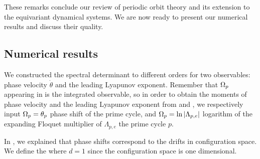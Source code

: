 These remarks conclude our review of periodic orbit theory and its
extension to the equivariant dynamical systems. We are now ready to present
our numerical results and discuss their quality.

\subsection{Numerical results}
\label{s-NumResults}

We constructed the spectral determinant  to different
orders for two observables: phase velocity $\dot{\theta}$ and the leading
Lyapunov exponent. Remember that $\Omega_p$ appearing in
 is the integrated observable, so in order to
obtain the moments of phase velocity and the leading Lyapunov exponent from
 and , we respectively input
$\Omega_p = \theta_p$ phase shift of the prime cycle, and
$\Omega_p = \ln |\Lambda_{p,e}|$ logarithm of the expanding Floquet
multiplier of $\Lambda_{p,e}$ the prime cycle $p$.

In , we explained that  phase shifts correspond
to the drifts in configuration space. We define the
where $d=1$ since the configuration space is one dimensional.

